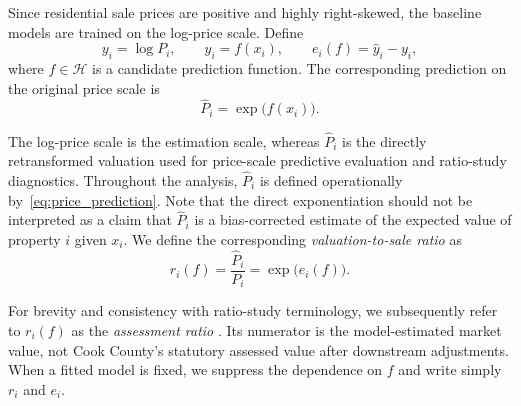 \documentclass[10pt]{article}
\theoremstyle{definition}
\newcommand{\1}{\mathbf{1}}
\begin{document}
Since residential sale prices are positive and highly right-skewed, the baseline models are trained on the log-price scale. Define
\begin{equation}
\label{eq:prediction_scale}
y_i=\log P_i,
\qquad
\widehat{y}_i=f(x_i),
\qquad
e_i(f)=\widehat{y}_i-y_i,
\end{equation}
where $f\in\mathcal{H}$ is a candidate prediction function. The corresponding prediction on the original price scale is
\begin{equation}
\label{eq:price_prediction}
\widehat{P}_i=\exp\bigl(f(x_i)\bigr).
\end{equation}


{The log-price scale is the estimation scale, whereas $\widehat{P}_i$ is the directly retransformed valuation used for price-scale predictive evaluation and ratio-study diagnostics. Throughout the analysis, $\widehat{P}_i$ is defined operationally by~\eqref{eq:price_prediction}. Note that the direct exponentiation should not be interpreted as a claim that $\widehat{P}_i$ is a bias-corrected estimate of the expected value of property $i$ given $x_i$. We define the corresponding \emph{valuation-to-sale ratio} as}
\begin{equation}
\label{eq:assessment_ratio_training}
r_i(f)
=
\frac{\widehat{P}_i}{P_i}
=
\exp\bigl(e_i(f)\bigr).
\end{equation}


{For brevity and consistency with ratio-study terminology, we subsequently refer to $r_i(f)$ as the \emph{assessment ratio} . Its numerator is the model-estimated market value, not Cook County's statutory assessed value after downstream adjustments.}
When a fitted model is fixed, we suppress the dependence on $f$ and write simply $r_i$ and $e_i$.
\end{document}

